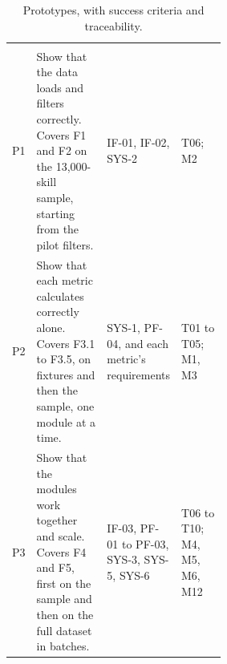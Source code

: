 \begin{singlespace}
\setlength{\LTcapwidth}{\linewidth}
\begin{longtable}{@{}L{0.07\linewidth} L{\tabcolsep\relax} L{0.25\linewidth} L{0.21\linewidth}@{}}
\caption{Prototypes, with success criteria and traceability.}\label{tab:prototypes}\\
 &  &  & \\
\midrule
\endfirsthead
{}
 &  &  & \\
\midrule
\endhead
\bottomrule
\endfoot
P1 & Show that the data loads and filters correctly. Covers F1 and F2 on the 13,000-skill sample, starting from the pilot filters. & IF-01, IF-02, SYS-2 & T06; M2\\
\addlinespace[3pt]
P2 & Show that each metric calculates correctly alone. Covers F3.1 to F3.5, on fixtures and then the sample, one module at a time. & SYS-1, PF-04, and each metric's requirements & T01 to T05; M1, M3\\
\addlinespace[3pt]
P3 & Show that the modules work together and scale. Covers F4 and F5, first on the sample and then on the full dataset in batches. & IF-03, PF-01 to PF-03, SYS-3, SYS-5, SYS-6 & T06 to T10; M4, M5, M6, M12\\
\end{longtable}
\end{singlespace}

